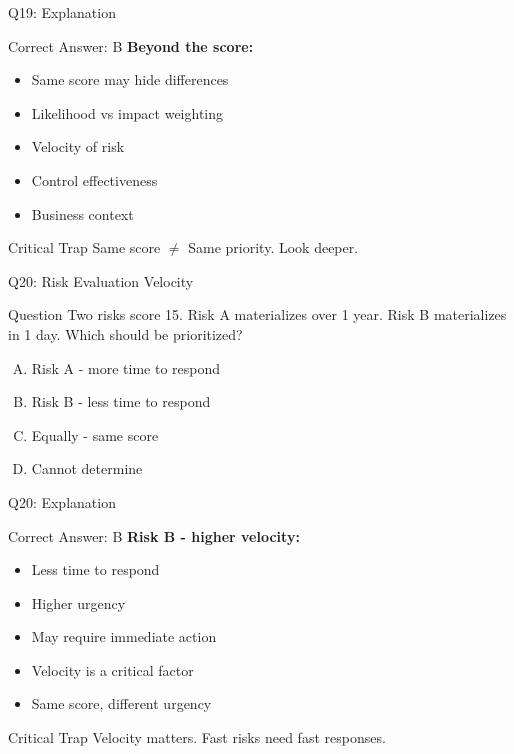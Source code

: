 \documentclass{beamer}
\begin{document}
			\begin{frame}{Q19: Explanation}
				\begin{block}{Correct Answer: B}
					\textbf{Beyond the score:}
					\begin{itemize}
						\item Same score may hide differences
						\item Likelihood vs impact weighting
						\item Velocity of risk
						\item Control effectiveness
						\item Business context
					\end{itemize}
				\end{block}
				\begin{alertblock}{Critical Trap}
					Same score $\neq$ Same priority. Look deeper.
				\end{alertblock}
			\end{frame}
			
			\begin{frame}{Q20: Risk Evaluation Velocity}
				\begin{block}{Question}
					Two risks score 15. Risk A materializes over 1 year. Risk B materializes in 1 day. Which should be prioritized?
				\end{block}
				\begin{enumerate}[(A)]
					\item Risk A - more time to respond
					\item Risk B - less time to respond
					\item Equally - same score
					\item Cannot determine
				\end{enumerate}
			\end{frame}
			
			\begin{frame}{Q20: Explanation}
				\begin{block}{Correct Answer: B}
					\textbf{Risk B - higher velocity:}
					\begin{itemize}
						\item Less time to respond
						\item Higher urgency
						\item May require immediate action
						\item Velocity is a critical factor
						\item Same score, different urgency
					\end{itemize}
				\end{block}
				\begin{alertblock}{Critical Trap}
					Velocity matters. Fast risks need fast responses.
				\end{alertblock}
			\end{frame}
			
\end{document}
